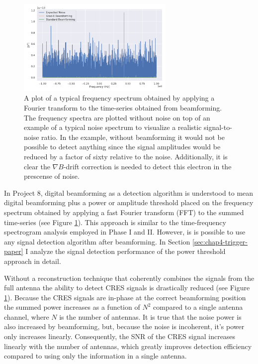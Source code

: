 \begin{figure}[htbp]
    \centering
    \includegraphics[width=0.67\textwidth]{figs/Chapter-4/220304_example_power_spectrum_gradb_vs_noise_vs_standard_bf.png}
    \caption{A plot of a typical frequency spectrum obtained by applying a Fourier transform to the time-series obtained from beamforming. The frequency spectra are plotted without noise on top of an example of a typical noise spectrum to visualize a realistic signal-to-noise ratio. In the example, without beamforming it would not be possible to detect anything since the signal amplitudes would be reduced by a factor of sixty relative to the noise. Additionally, it is clear the $\nabla B$-drift correction is needed to detect this electron in the prescense of noise.}
    \label{fig:chap4-bf-signal-example}
\end{figure}

In Project 8, digital beamforming as a detection algorithm is understood to mean digital beamforming plus a power or amplitude threshold placed on the frequency spectrum obtained by applying a fast Fourier transform (FFT) to the summed time-series (see Figure \ref{fig:chap4-bf-signal-example}). This approach is similar to the time-frequency spectrogram analysis employed in Phase I and II. However, is is possible to use any signal detection algorithm after beamforming. In Section \ref{sec:chap4-trigger-paper} I analyze the signal detection performance of the power threshold approach in detail.

Without a reconstruction technique that coherently combines the signals from the full antenna the ability to detect CRES signals is drastically reduced (see Figure \ref{fig:chap4-bf-signal-example}). Because the CRES signals are in-phase at the correct beamforming position the summed power increases as a function of $N^2$ compared to a single antenna channel, where $N$ is the number of antennas. It is true that the noise power is also increased by beamforming, but, because the noise is incoherent, it's power only increases linearly. Consequently, the SNR of the CRES signal increases linearly with the number of antennas, which greatly improves detection efficiency compared to using only the information in a single antenna.


